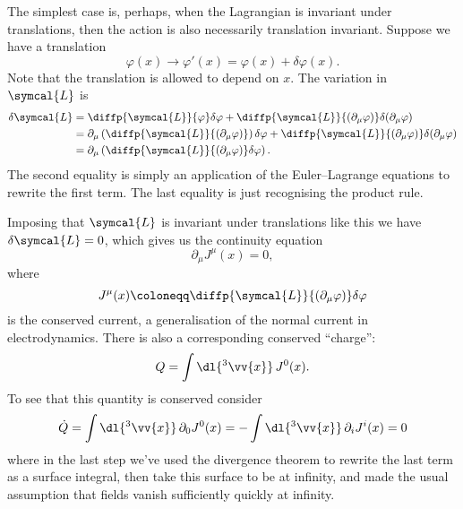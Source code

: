 \documentclass[fleqn]{NotesClass}
\newcommand{\lagrangianDensity}{\symcal{L}}
\begin{document}
    The simplest case is, perhaps, when the Lagrangian is invariant under translations, then the action is also necessarily translation invariant.
    Suppose we have a translation
    \begin{equation}
        \varphi(x) \to \varphi'(x) = \varphi(x) + \delta \varphi(x).
    \end{equation}
    Note that the translation is allowed to depend on \(x\).
    The variation in \(\lagrangianDensity\) is
    \begin{align}
        \delta \lagrangianDensity &= \diffp{\lagrangianDensity}{\varphi} \delta\varphi + \diffp{\lagrangianDensity}{(\partial_\mu \varphi)} \delta(\partial_\mu \varphi)\\
        &= \partial_\mu \left( \diffp{\lagrangianDensity}{(\partial_\mu\varphi)} \right) \delta \varphi + \diffp{\lagrangianDensity}{(\partial_\mu\varphi)} \delta(\partial_\mu\varphi)\\
        &= \partial_\mu\left( \diffp{\lagrangianDensity}{(\partial_\mu \varphi)} \delta \varphi \right).
    \end{align}
    The second equality is simply an application of the Euler--Lagrange equations to rewrite the first term.
    The last equality is just recognising the product rule.
    
    Imposing that \(\lagrangianDensity\) is invariant under translations like this we have \(\delta \lagrangianDensity = 0\), which gives us the continuity equation
    \begin{equation}
        \partial_\mu J^\mu(x) = 0,
    \end{equation}
    where
    \begin{equation}
        J^\mu(x) \coloneqq \diffp{\lagrangianDensity}{(\partial_\mu \varphi)} \delta \varphi
    \end{equation}
    is the conserved current, a generalisation of the normal current in electrodynamics.
    There is also a corresponding conserved \enquote{charge}:
    \begin{equation}
        Q = \int\dl{^3\vv{x}} \, J^0(x).
    \end{equation}
    To see that this quantity is conserved consider
    \begin{equation}
        \dot{Q} = \int \dl{^3\vv{x}} \, \partial_0 J^0(x) = -\int \dl{^3\vv{x}} \, \partial_i J^i(x) = 0
    \end{equation}
    where in the last step we've used the divergence theorem to rewrite the last term as a surface integral, then take this surface to be at infinity, and made the usual assumption that fields vanish sufficiently quickly at infinity.
    
\end{document}
